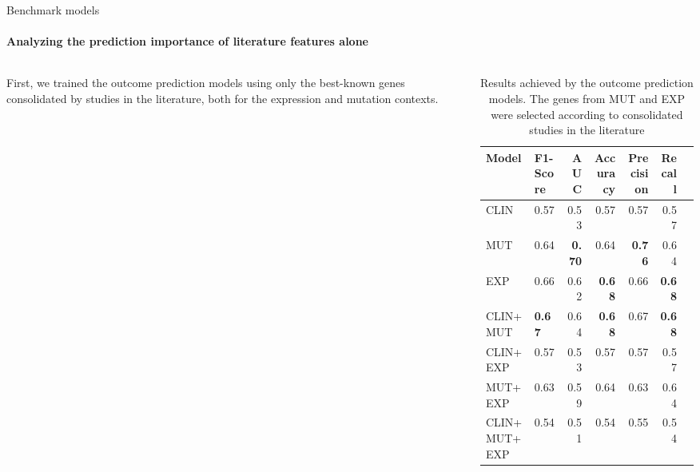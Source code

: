 \begin{frame}{Benchmark models}
\framesubtitle{Analyzing the prediction importance of literature features alone}

\begin{columns}
    \begin{column}{0.25\textwidth} 
    First, we trained the outcome prediction models using only the best-known genes consolidated by studies in the literature, both for the expression and mutation contexts.
    \end{column}

    \begin{column}{0.7\textwidth}
        
\small

\begin{table}[!htb]
    \centering
    \label{tab:literature-results}    
        \begin{tabular}{llrrrrr}
        \toprule
        Model &  F1-Score &       AUC &  Accuracy &  Precision &    Recall \\
        \midrule
        CLIN                       &  0.57 &  0.53 &  0.57 &   0.57 &  0.57 \\
        MUT                       &  0.64 &  \textbf{0.70} &  0.64 &   \textbf{0.76} &  0.64 \\
        EXP                        &  0.66 &  0.62 &  \textbf{0.68} &   0.66 &  \textbf{0.68} \\
        CLIN+MUT           &  \textbf{0.67} &  0.64 &  \textbf{0.68} &   0.67 &  \textbf{0.68} \\
        CLIN+EXP            &  0.57 &  0.53 &  0.57 &   0.57 &  0.57 \\
        MUT+EXP             &  0.63 &  0.59 &  0.64 &   0.63 &  0.64 \\
        CLIN+MUT+EXP &  0.54 &  0.51 &  0.54 &   0.55 &  0.54 \\
       
        \bottomrule
        \end{tabular}
        \caption{Results achieved by the outcome prediction models. The genes from MUT and EXP were selected according to consolidated studies in the literature}
\end{table}
    \end{column}

    
\end{columns}
\end{frame}



